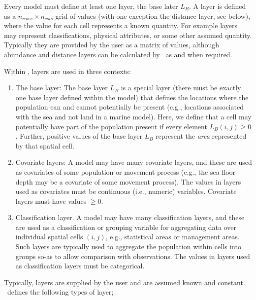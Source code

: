 Every model must define at least one layer, the base later $L_B$. A layer is defined as a $n_{rows} \times n_{cols}$ grid of values (with one exception \textemdash the distance layer, see below), where the value for each cell represents a known quantity. For example layers may represent classifications, physical attributes, or some other assumed quantity. Typically they are provided by the user as a matrix of values, although abundance and distance layers can be calculated by \SPM\ as and when required. 

Within \SPM, layers are used in three contexts:
\begin{enumerate}
\item The base layer: The base layer $L_B$ is a special layer (there must be exactly one base layer defined within the model) that defines the locations where the population can and cannot potentially be present (e.g., locations associated with the sea and not land in a marine model). Here, we define that a cell may potentially have part of the population present if every element $L_B(i,j) \ge 0$. Further, positive values of the base layer $L_B$ represent the \emph{area} represented by that spatial cell. 
\item Covariate layers: A model may have many covariate layers, and these are used as covariates of some population or movement process (e.g., the sea floor depth may be a covariate of some movement process). The values in layers used as covariates must be continuous (i.e., numeric) variables. Covariate layers must have values $\ge0$.
\item Classification layer. A model may have many classification layers, and these are used as a classification or grouping variable for aggregating data over individual spatial cells $(i,j)$, e.g., statistical areas or management areas. Such layers are typically used to aggregate the population within cells into groups so-as to allow comparison with observations. The values in layers used as classification layers must be categorical.
\end{enumerate}

Typically, layers are supplied by the user and are assumed known and constant. \SPM\ defines the following types of layer;

